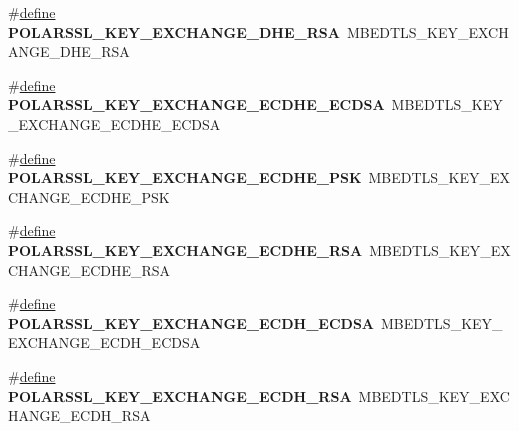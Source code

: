 \begin{DoxyCompactItemize}
\item 
\mbox{\label{compat-1_83_8h_a7fded867682fdc0a81c3da4ddcb1bcfd}} 
\#\hyperlink{structdefine}{define} {\bfseries P\+O\+L\+A\+R\+S\+S\+L\+\_\+\+K\+E\+Y\+\_\+\+E\+X\+C\+H\+A\+N\+G\+E\+\_\+\+D\+H\+E\+\_\+\+R\+SA}~M\+B\+E\+D\+T\+L\+S\+\_\+\+K\+E\+Y\+\_\+\+E\+X\+C\+H\+A\+N\+G\+E\+\_\+\+D\+H\+E\+\_\+\+R\+SA
\item 
\mbox{\label{compat-1_83_8h_a514845d6680be74831a017767a637249}} 
\#\hyperlink{structdefine}{define} {\bfseries P\+O\+L\+A\+R\+S\+S\+L\+\_\+\+K\+E\+Y\+\_\+\+E\+X\+C\+H\+A\+N\+G\+E\+\_\+\+E\+C\+D\+H\+E\+\_\+\+E\+C\+D\+SA}~M\+B\+E\+D\+T\+L\+S\+\_\+\+K\+E\+Y\+\_\+\+E\+X\+C\+H\+A\+N\+G\+E\+\_\+\+E\+C\+D\+H\+E\+\_\+\+E\+C\+D\+SA
\item 
\mbox{\label{compat-1_83_8h_adb61397794ca4fd9fc820c47228a2f75}} 
\#\hyperlink{structdefine}{define} {\bfseries P\+O\+L\+A\+R\+S\+S\+L\+\_\+\+K\+E\+Y\+\_\+\+E\+X\+C\+H\+A\+N\+G\+E\+\_\+\+E\+C\+D\+H\+E\+\_\+\+P\+SK}~M\+B\+E\+D\+T\+L\+S\+\_\+\+K\+E\+Y\+\_\+\+E\+X\+C\+H\+A\+N\+G\+E\+\_\+\+E\+C\+D\+H\+E\+\_\+\+P\+SK
\item 
\mbox{\label{compat-1_83_8h_a43e471e2c1ba8d696df9d599033c0bea}} 
\#\hyperlink{structdefine}{define} {\bfseries P\+O\+L\+A\+R\+S\+S\+L\+\_\+\+K\+E\+Y\+\_\+\+E\+X\+C\+H\+A\+N\+G\+E\+\_\+\+E\+C\+D\+H\+E\+\_\+\+R\+SA}~M\+B\+E\+D\+T\+L\+S\+\_\+\+K\+E\+Y\+\_\+\+E\+X\+C\+H\+A\+N\+G\+E\+\_\+\+E\+C\+D\+H\+E\+\_\+\+R\+SA
\item 
\mbox{\label{compat-1_83_8h_a52dee1a17f8d68917178f5679b2e0fa8}} 
\#\hyperlink{structdefine}{define} {\bfseries P\+O\+L\+A\+R\+S\+S\+L\+\_\+\+K\+E\+Y\+\_\+\+E\+X\+C\+H\+A\+N\+G\+E\+\_\+\+E\+C\+D\+H\+\_\+\+E\+C\+D\+SA}~M\+B\+E\+D\+T\+L\+S\+\_\+\+K\+E\+Y\+\_\+\+E\+X\+C\+H\+A\+N\+G\+E\+\_\+\+E\+C\+D\+H\+\_\+\+E\+C\+D\+SA
\item 
\mbox{\label{compat-1_83_8h_ab1b936636468e98f54d2c4263be896c6}} 
\#\hyperlink{structdefine}{define} {\bfseries P\+O\+L\+A\+R\+S\+S\+L\+\_\+\+K\+E\+Y\+\_\+\+E\+X\+C\+H\+A\+N\+G\+E\+\_\+\+E\+C\+D\+H\+\_\+\+R\+SA}~M\+B\+E\+D\+T\+L\+S\+\_\+\+K\+E\+Y\+\_\+\+E\+X\+C\+H\+A\+N\+G\+E\+\_\+\+E\+C\+D\+H\+\_\+\+R\+SA
\item 
\mbox{\label{compat-1_83_8h_af16b9e25fe667ed8eab6fb64fd459619}} 

\end{DoxyCompactItemize}
